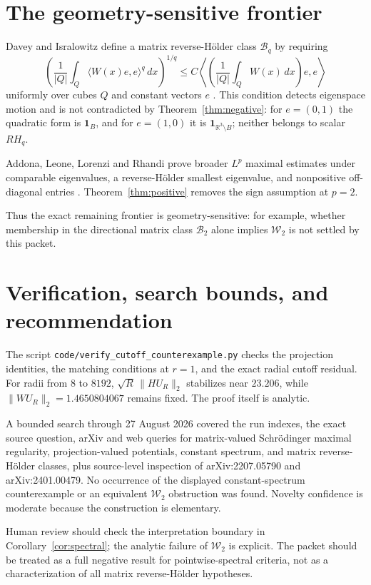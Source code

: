 \documentclass[11pt]{article}
\newcommand{\R}{\mathbb R}
\newcommand{\one}{\mathbf 1}
\newcommand{\Wtwo}{\mathcal W_2}
\begin{document}
\section{The geometry-sensitive frontier}

Davey and Isralowitz define a matrix reverse-H\"older class
$\mathcal B_q$ by requiring
\[
 \left(\frac1{|Q|}\int_Q\langle W(x)e,e\rangle^q\,dx\right)^{1/q}
 \le C\left\langle\left(\frac1{|Q|}\int_QW(x)\,dx\right)e,e\right\rangle
\]
uniformly over cubes $Q$ and constant vectors $e$
\cite[Definition~2.1]{DI}. This condition detects eigenspace motion and is
not contradicted by Theorem~\ref{thm:negative}: for $e=(0,1)$ the quadratic
form is $\one_B$, and for $e=(1,0)$ it is $\one_{\R^3\setminus B}$; neither
belongs to scalar $RH_q$.

Addona, Leone, Lorenzi and Rhandi prove broader $L^p$ maximal estimates under
comparable eigenvalues, a reverse-H\"older smallest eigenvalue, and
nonpositive off-diagonal entries \cite[Theorem~6.1]{ALLR}.
Theorem~\ref{thm:positive} removes the sign assumption at $p=2$.

Thus the exact remaining frontier is geometry-sensitive: for example,
whether membership in the directional matrix class $\mathcal B_2$ alone
implies $\Wtwo$ is not settled by this packet.

\section{Verification, search bounds, and recommendation}

The script \texttt{code/verify\_cutoff\_counterexample.py} checks the
projection identities, the matching conditions at $r=1$, and the exact radial
cutoff residual. For radii from $8$ to $8192$,
$\sqrt R\,\|HU_R\|_2$ stabilizes near $23.206$, while
$\|WU_R\|_2=1.4650804067$ remains fixed. The proof itself is analytic.

A bounded search through 27 August 2026 covered the run indexes, the exact
source question, arXiv and web queries for matrix-valued Schr\"odinger
maximal regularity, projection-valued potentials, constant spectrum, and
matrix reverse-H\"older classes, plus source-level inspection of
arXiv:2207.05790 and arXiv:2401.00479. No occurrence of the displayed
constant-spectrum counterexample or an equivalent $\Wtwo$ obstruction was
found. Novelty confidence is moderate because the construction is elementary.

Human review should check the interpretation boundary in
Corollary~\ref{cor:spectral}; the analytic failure of $\Wtwo$ is explicit.
The packet should be treated as a full negative result for pointwise-spectral
criteria, not as a characterization of all matrix reverse-H\"older
hypotheses.
\end{document}
